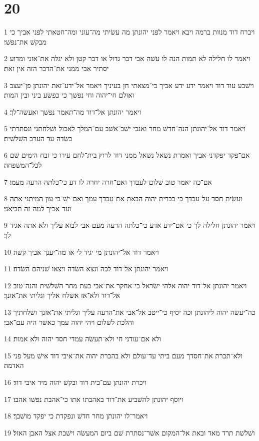 \chapter{20}

\par 1 ויברח דוד מנוות ברמה ויבא ויאמר לפני יהונתן מה עשׂיתי מה־עוני ומה־חטאתי לפני אביך כי מבקשׁ את־נפשׁי׃
\par 2 ויאמר לו חלילה לא תמות הנה לו עשׁה אבי דבר גדול או דבר קטן ולא יגלה את־אזני ומדוע יסתיר אבי ממני את־הדבר הזה אין זאת׃
\par 3 וישׁבע עוד דוד ויאמר ידע ידע אביך כי־מצאתי חן בעיניך ויאמר אל־ידע־זאת יהונתן פן־יעצב ואולם חי־יהוה וחי נפשׁך כי כפשׂע ביני ובין המות׃
\par 4 ויאמר יהונתן אל־דוד מה־תאמר נפשׁך ואעשׂה־לך׃
\par 5 ויאמר דוד אל־יהונתן הנה־חדשׁ מחר ואנכי ישׁב־אשׁב עם־המלך לאכול ושׁלחתני ונסתרתי בשׂדה עד הערב השׁלשׁית׃
\par 6 אם־פקד יפקדני אביך ואמרת נשׁאל נשׁאל ממני דוד לרוץ בית־לחם עירו כי זבח הימים שׁם לכל־המשׁפחה׃
\par 7 אם־כה יאמר טוב שׁלום לעבדך ואם־חרה יחרה לו דע כי־כלתה הרעה מעמו׃
\par 8 ועשׂית חסד על־עבדך כי בברית יהוה הבאת את־עבדך עמך ואם־ישׁ־בי עון המיתני אתה ועד־אביך למה־זה תביאני׃
\par 9 ויאמר יהונתן חלילה לך כי אם־ידע אדע כי־כלתה הרעה מעם אבי לבוא עליך ולא אתה אגיד לך׃
\par 10 ויאמר דוד אל־יהונתן מי יגיד לי או מה־יענך אביך קשׁה׃
\par 11 ויאמר יהונתן אל־דוד לכה ונצא השׂדה ויצאו שׁניהם השׂדה׃
\par 12 ויאמר יהונתן אל־דוד יהוה אלהי ישׂראל כי־אחקר את־אבי כעת מחר השׁלשׁית והנה־טוב אל־דוד ולא־אז אשׁלח אליך וגליתי את־אזנך׃
\par 13 כה־יעשׂה יהוה ליהונתן וכה יסיף כי־ייטב אל־אבי את־הרעה עליך וגליתי את־אזנך ושׁלחתיך והלכת לשׁלום ויהי יהוה עמך כאשׁר היה עם־אבי׃
\par 14 ולא אם־עודני חי ולא־תעשׂה עמדי חסד יהוה ולא אמות׃
\par 15 ולא־תכרת את־חסדך מעם ביתי עד־עולם ולא בהכרת יהוה את־איבי דוד אישׁ מעל פני האדמה׃
\par 16 ויכרת יהונתן עם־בית דוד ובקשׁ יהוה מיד איבי דוד׃
\par 17 ויוסף יהונתן להשׁביע את־דוד באהבתו אתו כי־אהבת נפשׁו אהבו׃
\par 18 ויאמר־לו יהונתן מחר חדשׁ ונפקדת כי יפקד מושׁבך׃
\par 19 ושׁלשׁת תרד מאד ובאת אל־המקום אשׁר־נסתרת שׁם ביום המעשׂה וישׁבת אצל האבן האזל׃
